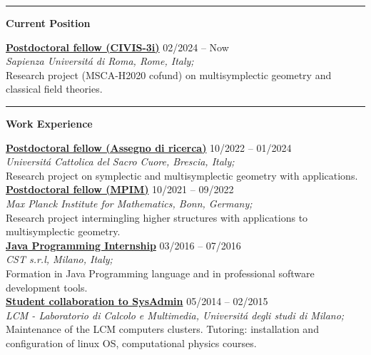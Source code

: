 \documentclass[a4paper]{article}
\newcommand{\block}[1]{\hrule \vspace{0.2cm} \textbf{\Large #1} \vspace{0.2cm}}
\newcommand{\voice}[5]{\href{#4}{\textbf{#1}} \hfill #2 \\ \textit{#3} \\ {\small #5} \vspace{0.2cm} \\}
\begin{document}
\begin{minipage}[t]{0.6\columnwidth}


    \block{Current Position}

    
    \voice{Postdoctoral fellow (CIVIS-3i)}
        {02/2024 -- Now}
        {Sapienza Universit\'a di Roma, Rome, Italy;}
        {https://civis3i.univ-amu.fr/en/civis3i-alliance-programme}       
        {Research project (MSCA-H2020 cofund) on multisymplectic geometry and classical field theories.\vspace{-0.25cm}}





    \block{Work Experience}

    
    \voice{Postdoctoral fellow (Assegno di ricerca)}
        {10/2022 -- 01/2024}
        {Universit\'a Cattolica del Sacro Cuore, Brescia, Italy;}
        {https://dipartimenti.unicatt.it/dmf-home}       
        {Research project on symplectic and multisymplectic geometry with applications.}
    \voice{Postdoctoral fellow (MPIM)}
        {10/2021 -- 09/2022}
        {Max Planck Institute for Mathematics, Bonn, Germany;}
        {https://www.mpim-bonn.mpg.de/}       
        {Research project intermingling higher structures with applications to multisymplectic geometry.}
    \voice{Java Programming Internship}
        {03/2016 -- 07/2016}
        {CST s.r.l, Milano, Italy;}
        {https://www.csttech.it/}       
        {Formation in Java Programming language and in professional software development tools.}
    \voice{Student collaboration to SysAdmin}
        {05/2014 -- 02/2015}
        {LCM - Laboratorio di Calcolo e Multimedia, Universit\'a degli studi di Milano;}
        {https://lcm.mi.infn.it/}       
        {Maintenance of the LCM computers clusters. Tutoring: installation and configuration of linux OS, computational physics courses.\vspace{-0.25cm}}




\end{minipage}
\end{document}
